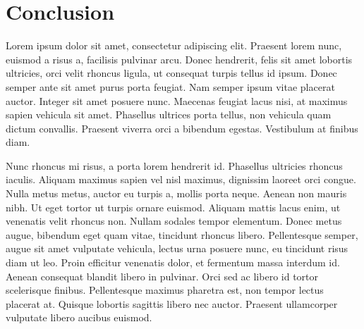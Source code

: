 \documentclass[../main.tex]{subfiles}
\begin{document}
\section{Conclusion}

    Lorem ipsum dolor sit amet, consectetur adipiscing elit. Praesent lorem nunc, euismod a risus a,
    facilisis pulvinar arcu. Donec hendrerit, felis sit amet lobortis ultricies, orci velit rhoncus 
    ligula, ut consequat turpis tellus id ipsum. Donec semper ante sit amet purus porta feugiat. 
    Nam semper ipsum vitae placerat auctor. Integer sit amet posuere nunc. Maecenas feugiat lacus 
    nisi, at maximus sapien vehicula sit amet. Phasellus ultrices porta tellus, non vehicula quam 
    dictum convallis. Praesent viverra orci a bibendum egestas. Vestibulum at finibus diam.

    Nunc rhoncus mi risus, a porta lorem hendrerit id. Phasellus ultricies rhoncus iaculis. Aliquam 
    maximus sapien vel nisl maximus, dignissim laoreet orci congue. Nulla metus metus, auctor eu turpis 
    a, mollis porta neque. Aenean non mauris nibh. Ut eget tortor ut turpis ornare euismod. Aliquam 
    mattis lacus enim, ut venenatis velit rhoncus non. Nullam sodales tempor elementum. Donec metus 
    augue, bibendum eget quam vitae, tincidunt rhoncus libero. Pellentesque semper, augue sit amet 
    vulputate vehicula, lectus urna posuere nunc, eu tincidunt risus diam ut leo. Proin efficitur 
    venenatis dolor, et fermentum massa interdum id. Aenean consequat blandit libero in pulvinar. Orci 
    sed ac libero id tortor scelerisque finibus. Pellentesque maximus pharetra est, non tempor lectus 
    placerat at. Quisque lobortis sagittis libero nec auctor. Praesent ullamcorper vulputate libero
    aucibus euismod. 
    
\end{document}
